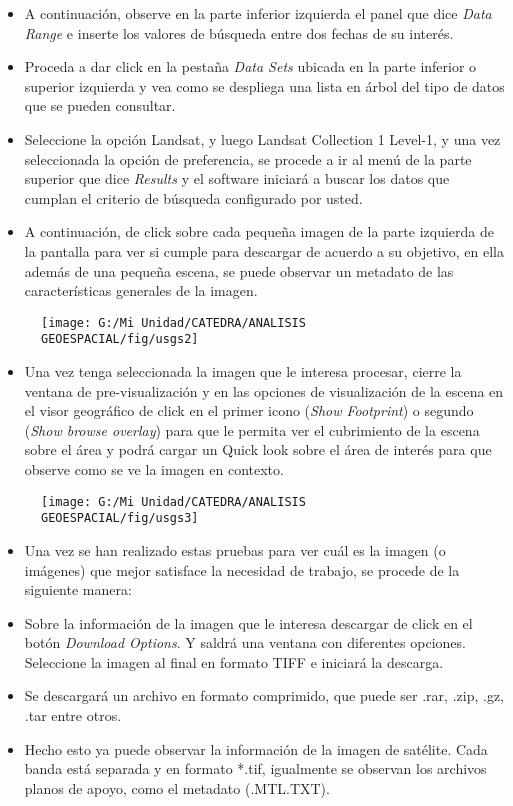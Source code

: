 \documentclass[a4paper,oneside,11pt,]{article}
\begin{document}
\begin{itemize}
\item A continuación, observe en la parte inferior izquierda el panel que dice \emph{Data Range} e inserte los valores de búsqueda entre dos fechas de su interés. 
\item Proceda a dar click en la pestaña \emph{Data Sets} ubicada en la parte inferior o superior izquierda y vea como se despliega una lista en árbol del tipo de datos que se pueden consultar.
\item Seleccione la opción Landsat, y luego Landsat Collection 1 Level-1, y una vez seleccionada la opción de preferencia, se procede a ir al menú de la parte superior que dice \emph{Results} y el software iniciará a buscar los datos que cumplan el criterio de búsqueda configurado por usted. 
\item A continuación, de click sobre cada pequeña imagen de la parte izquierda de la pantalla para ver si cumple para descargar de acuerdo a su objetivo, en ella además de una pequeña escena, se puede observar un metadato de las características generales de la imagen.
\end{itemize}

\begin{figure}
\centering
\texttt{[image: G:/Mi Unidad/CATEDRA/ANALISIS GEOESPACIAL/fig/usgs2]}
\end{figure}

\begin{itemize}
\item Una vez tenga seleccionada la imagen que le interesa procesar, cierre la ventana de pre-visualización y en las opciones de visualización de la escena en el visor geográfico de click en el primer icono (\emph{Show Footprint}) o segundo (\emph{Show browse overlay}) para que le permita ver el cubrimiento de la escena sobre el área y podrá cargar un Quick look sobre el área de interés para que observe como se ve la imagen en contexto.
\end{itemize}

\begin{figure}
\centering
\texttt{[image: G:/Mi Unidad/CATEDRA/ANALISIS GEOESPACIAL/fig/usgs3]}
\end{figure}

\begin{itemize}
\item Una vez se han realizado estas pruebas para ver cuál es la imagen (o imágenes) que mejor satisface la necesidad de trabajo, se procede de la siguiente manera:
\item Sobre la información de la imagen que le interesa descargar de click en el botón \emph{Download Options}. Y saldrá una ventana con diferentes opciones. Seleccione la imagen al final en formato TIFF e iniciará la descarga.
\item Se descargará un archivo en formato comprimido, que puede ser .rar, .zip, .gz, .tar entre otros.
\item Hecho esto ya puede observar la información de la imagen de satélite. Cada banda está separada y en formato *.tif, igualmente se observan los archivos planos de apoyo, como el metadato (.MTL.TXT).
\end{itemize}
\end{document}

